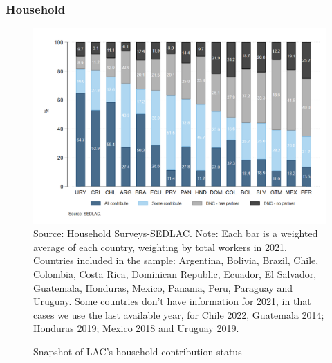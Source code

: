\documentclass[english]{article}
\begin{document}
\begin{itemize}
\subsubsection{Household}
\begin{figure}[!htb]
    \justifying
     \caption{Snapshot of LAC’s household contribution status}     \includegraphics[scale=.3]{latex/figures/Household/snapshot_household.png}
    \label{fig:Householdlastyear}
    \footnotesize{Source: Household Surveys-SEDLAC.}
    \footnotesize{Note: Each bar is a weighted average of each country, weighting by total workers in 2021. Countries included in the sample: Argentina, Bolivia, Brazil, Chile, Colombia, Costa Rica, Dominican Republic, Ecuador, El Salvador, Guatemala, Honduras, Mexico, Panama, Peru, Paraguay and Uruguay. Some countries don’t have information for 2021, in that cases we use the last available year, for Chile 2022, Guatemala 2014; Honduras 2019; Mexico 2018 and Uruguay 2019.}
\end{figure}


\end{itemize}
\end{document}
